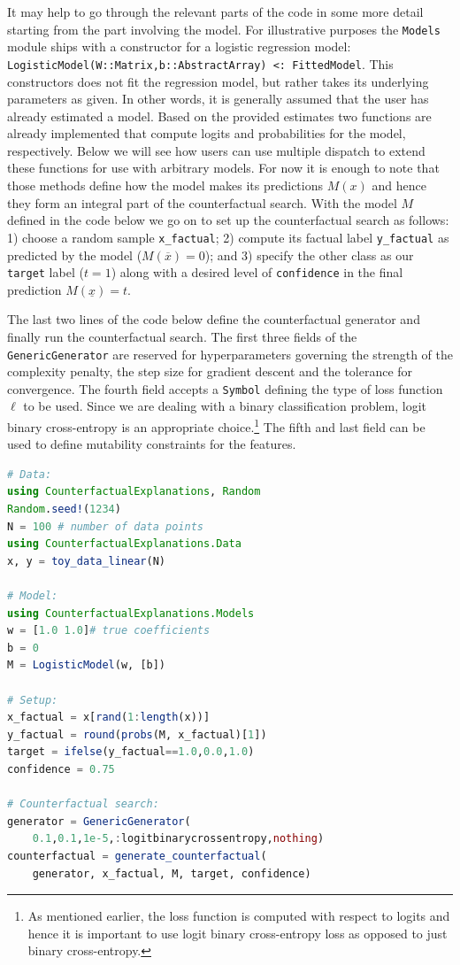 \documentclass[
  letterpaper,
  DIV=11,
  numbers=noendperiod]{scrartcl}
\begin{document}
It may help to go through the relevant parts of the code in some more
detail starting from the part involving the model. For illustrative
purposes the \texttt{Models} module ships with a constructor for a
logistic regression model:
\texttt{LogisticModel(W::Matrix,b::AbstractArray)\ \textless{}:\ FittedModel}.
This constructors does not fit the regression model, but rather takes
its underlying parameters as given. In other words, it is generally
assumed that the user has already estimated a model. Based on the
provided estimates two functions are already implemented that compute
logits and probabilities for the model, respectively. Below we will see
how users can use multiple dispatch to extend these functions for use
with arbitrary models. For now it is enough to note that those methods
define how the model makes its predictions \(M(x)\) and hence they form
an integral part of the counterfactual search. With the model \(M\)
defined in the code below we go on to set up the counterfactual search
as follows: 1) choose a random sample \texttt{x\_factual}; 2) compute
its factual label \texttt{y\_factual} as predicted by the model
(\(M(\overline{x})=0\)); and 3) specify the other class as our
\texttt{target} label (\(t=1\)) along with a desired level of
\texttt{confidence} in the final prediction \(M(\underline{x})=t\).

The last two lines of the code below define the counterfactual generator
and finally run the counterfactual search. The first three fields of the
\texttt{GenericGenerator} are reserved for hyperparameters governing the
strength of the complexity penalty, the step size for gradient descent
and the tolerance for convergence. The fourth field accepts a
\texttt{Symbol} defining the type of loss function \(\ell\) to be used.
Since we are dealing with a binary classification problem, logit binary
cross-entropy is an appropriate choice.\footnote{As mentioned earlier,
  the loss function is computed with respect to logits and hence it is
  important to use logit binary cross-entropy loss as opposed to just
  binary cross-entropy.} The fifth and last field can be used to define
mutability constraints for the features.

\begin{lstlisting}[language = Julia]
# Data:
using CounterfactualExplanations, Random
Random.seed!(1234)
N = 100 # number of data points
using CounterfactualExplanations.Data
x, y = toy_data_linear(N) 

# Model:
using CounterfactualExplanations.Models 
w = [1.0 1.0]# true coefficients
b = 0
M = LogisticModel(w, [b])

# Setup:
x_factual = x[rand(1:length(x))]
y_factual = round(probs(M, x_factual)[1])
target = ifelse(y_factual==1.0,0.0,1.0) 
confidence = 0.75 

# Counterfactual search:
generator = GenericGenerator(
    0.1,0.1,1e-5,:logitbinarycrossentropy,nothing)
counterfactual = generate_counterfactual(
    generator, x_factual, M, target, confidence)
\end{lstlisting}
\end{document}
